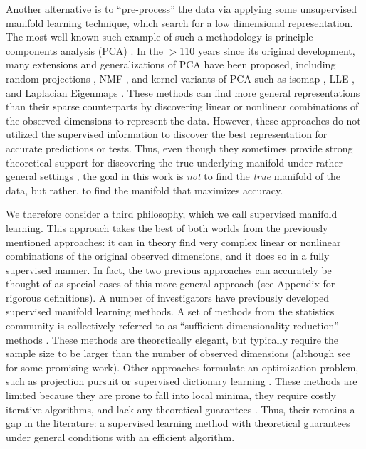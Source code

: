 \documentclass[10pt]{article}
\begin{document}
Another alternative is to ``pre-process'' the data via applying some unsupervised manifold learning technique, which search for a low dimensional representation.  The most well-known such example of such a methodology is principle components analysis (PCA) \cite{Pearson1901,Hotelling1933}.  In the $>$110 years since its original development, many extensions and generalizations of PCA have been proposed, including random projections \cite{Candes06a}, NMF \cite{Paatero94a, LeeSeung99}, and kernel variants of PCA such as isomap \cite{Tenenbaum2000}, LLE \cite{Roweis2000}, and Laplacian Eigenmaps \cite{Belkin2003}. These methods can find more general representations than their sparse counterparts by discovering linear or nonlinear combinations of the observed dimensions to represent the data.  However, these approaches do not utilized the supervised information to discover the best representation for accurate predictions or tests.  Thus, even though they sometimes provide strong theoretical support for discovering the true underlying manifold under rather general settings \cite{deSilva2003,Allard12a}, the goal in this work is \emph{not} to find the \emph{true} manifold of the data, but rather, to find the manifold that maximizes accuracy.


We therefore consider a third philosophy, which we call supervised manifold learning.  This approach takes the best of both worlds from the previously mentioned approaches: it can in theory find very complex linear or nonlinear combinations of the original observed dimensions, and it does so in a fully supervised manner.  In fact, the two previous approaches can accurately be thought of as special cases of this more general approach (see Appendix for rigorous definitions).  A number of investigators have previously developed supervised manifold learning methods.  A set of methods from the statistics community is collectively referred to as   ``sufficient dimensionality reduction'' methods  \cite{Li1991, Cook91a, Globerson2003, Bouveyron07a, Cook08a}.  These methods are theoretically elegant, but typically require the sample size to be larger than the number of observed dimensions (although see \cite{Cook13a} for some promising work).  Other approaches formulate an optimization problem, such as projection pursuit \cite{Huber1985} or supervised dictionary learning \cite{Mairal2008}.  These methods are limited because they are prone to fall into local minima, they require costly iterative algorithms, and lack any theoretical guarantees \cite{Belkin2006}.  Thus, their remains a gap in the literature: a supervised learning method with theoretical guarantees under general conditions with an efficient algorithm.
\end{document}
